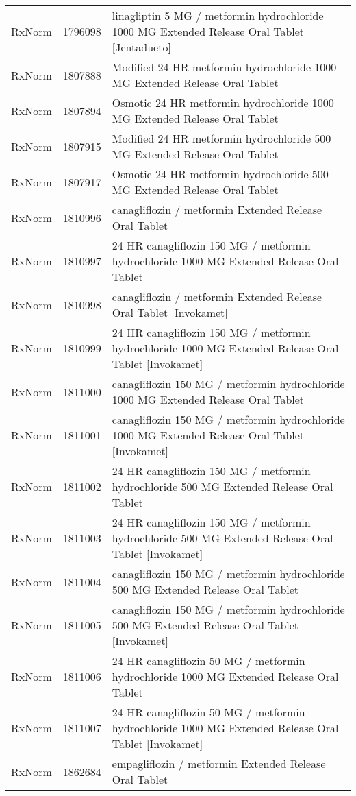 \begin{longtable}{p{}p{}p{}}
  RxNorm & 1796098 & linagliptin 5 MG / metformin hydrochloride 1000 MG Extended Release Oral Tablet [Jentadueto] \\ 
  RxNorm & 1807888 & Modified 24 HR metformin hydrochloride 1000 MG Extended Release Oral Tablet \\ 
  RxNorm & 1807894 & Osmotic 24 HR metformin hydrochloride 1000 MG Extended Release Oral Tablet \\ 
  RxNorm & 1807915 & Modified 24 HR metformin hydrochloride 500 MG Extended Release Oral Tablet \\ 
  RxNorm & 1807917 & Osmotic 24 HR metformin hydrochloride 500 MG Extended Release Oral Tablet \\ 
  RxNorm & 1810996 & canagliflozin / metformin Extended Release Oral Tablet \\ 
  RxNorm & 1810997 & 24 HR canagliflozin 150 MG / metformin hydrochloride 1000 MG Extended Release Oral Tablet \\ 
  RxNorm & 1810998 & canagliflozin / metformin Extended Release Oral Tablet [Invokamet] \\ 
  RxNorm & 1810999 & 24 HR canagliflozin 150 MG / metformin hydrochloride 1000 MG Extended Release Oral Tablet [Invokamet] \\ 
  RxNorm & 1811000 & canagliflozin 150 MG / metformin hydrochloride 1000 MG Extended Release Oral Tablet \\ 
  RxNorm & 1811001 & canagliflozin 150 MG / metformin hydrochloride 1000 MG Extended Release Oral Tablet [Invokamet] \\ 
  RxNorm & 1811002 & 24 HR canagliflozin 150 MG / metformin hydrochloride 500 MG Extended Release Oral Tablet \\ 
  RxNorm & 1811003 & 24 HR canagliflozin 150 MG / metformin hydrochloride 500 MG Extended Release Oral Tablet [Invokamet] \\ 
  RxNorm & 1811004 & canagliflozin 150 MG / metformin hydrochloride 500 MG Extended Release Oral Tablet \\ 
  RxNorm & 1811005 & canagliflozin 150 MG / metformin hydrochloride 500 MG Extended Release Oral Tablet [Invokamet] \\ 
  RxNorm & 1811006 & 24 HR canagliflozin 50 MG / metformin hydrochloride 1000 MG Extended Release Oral Tablet \\ 
  RxNorm & 1811007 & 24 HR canagliflozin 50 MG / metformin hydrochloride 1000 MG Extended Release Oral Tablet [Invokamet] \\ 
  RxNorm & 1862684 & empagliflozin / metformin Extended Release Oral Tablet \\ 

\end{longtable}
